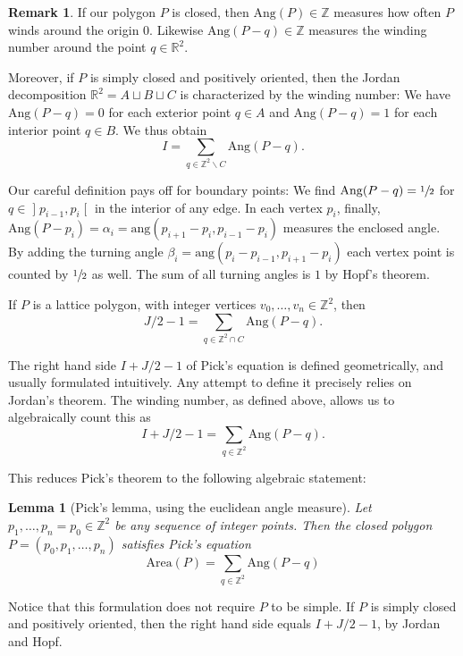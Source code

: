 \documentclass[a4paper]{amsart}
\numberwithin{equation}{section}
\theoremstyle{plain}
\newtheorem{lemma}[theorem]{Lemma}
\theoremstyle{definition}
\newtheorem{remark}[theorem]{Remark}
\newcommand{\Z}{\mathbb{Z}}
\newcommand{\R}{\mathbb{R}}
\newcommand{\ee}[2]{\mathopen] #1, #2 \mathclose[}
\newcommand{\minus}{\smallsetminus}
\newcommand{\Area}{\mathrm{Area}}
\newcommand{\ang}{\mathrm{ang}}
\newcommand{\Ang}{\mathrm{Ang}}
\newcommand{\Welp}{\mathrm{Welp}}
\begin{document}
\begin{remark}
  If our polygon $P$ is closed, then $\Ang(P) \in \Z$
  measures how often $P$ winds around the origin $0$.
  Likewise $\Ang(P-q) \in \Z$ measures the winding number
  around the point $q \in \R^2$.

  Moreover, if $P$ is simply closed and positively oriented,
  then the Jordan decomposition $\R^2 = A \sqcup B \sqcup C$
  is characterized by the winding number:
  We have $\Ang(P-q) = 0$ for each exterior point $q \in A$
  and $\Ang(P-q) = 1$ for each interior point $q \in B$.
  We thus obtain
  \[
  I = \sum_{q \in \Z^2 \minus C} \Ang(P-q) .
  \]
  
  Our careful definition pays off for boundary points:
  We find $\Ang(P-q) = \sfrac{1}{2}$
  for $q \in \ee{p_{i-1}}{p_i}$ in the interior of any edge.
  In each vertex $p_i$, finally,
  $\Ang(P-p_i) = \alpha_i = \ang(p_{i+1}-p_i, p_{i-1}-p_i)$
  measures the enclosed angle. 
  By adding the turning angle $\beta_i = \ang(p_i-p_{i-1}, p_{i+1}-p_i)$
  each vertex point is counted by $\sfrac{1}{2}$ as well.
  The sum of all turning angles is $1$ by Hopf's theorem.

  If $P$ is a lattice polygon, with integer vertices $v_0,\ldots,v_n \in \Z^2$, then
  \[
  J/2 - 1 = \sum_{q \in \Z^2 \cap C} \Ang(P-q) .
  \]
\end{remark}

The right hand side $I + J/2 - 1$ of Pick's equation
is defined geometrically, and usually formulated intuitively.
Any attempt to define it precisely relies on Jordan's theorem.
The winding number, as defined above, allows us to algebraically count
this as %
\[
I + J/2 - 1  = \sum_{q \in \Z^2} \Ang(P-q) .
\]

This reduces Pick's theorem to the following algebraic statement:

\begin{lemma}[Pick's lemma, using the euclidean angle measure]
  Let $p_1,\ldots,p_n=p_0 \in \Z^2$ be any sequence of integer points.
  Then the closed polygon $P = (p_0,p_1,\ldots,p_n)$ satisfies Pick's equation 
  \[
  \Area(P) = \sum_{q \in \Z^2} \Ang(P-q)
  \]
\end{lemma}

Notice that this formulation does not require $P$ to be simple.
If $P$ is simply closed and positively oriented, 
then the right hand side equals $I + J/2 - 1$,
by Jordan and Hopf.
\end{document}
